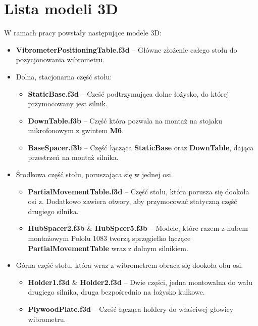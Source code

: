 \chapter{Lista modeli 3D}
W ramach pracy powstały następujące modele 3D:
\begin{itemize}
    \item \textbf{VibrometerPositioningTable.f3d} -- Główne złożenie całego stołu do pozycjonowania wibrometru.
    \item Dolna, stacjonarna część stołu:
    \begin{itemize}
        \item \textbf{StaticBase.f3d} -- Cześć podtrzymująca dolne łożysko, do której przymocowany jest silnik.
        \item  \textbf{DownTable.f3b} -- Część która pozwala na montaż na stojaku mikrofonowym z gwintem \textbf{M6}.
        \item  \textbf{BaseSpacer.f3b} -- Część łącząca \textbf{StaticBase} oraz \textbf{DownTable}, dająca przestrzeń na montaż silnika.
    \end{itemize}
    \item Środkowa część stołu, poruszająca się w jednej osi.
    \begin{itemize}
        \item \textbf{PartialMovementTable.f3d} -- Część stołu, która porusza się dookoła osi z. Dodatkowo zawiera otwory, aby przymocować statyczną część drugiego silnika.
        \item \textbf{HubSpacer2.f3b} \& \textbf{HubSpcer5.f3b} -- Modele, które razem z hubem montażowym Pololu 1083 tworzą sprzęgiełko łączące \textbf{PartialMovementTable} wraz z dolnym silnikiem.
    \end{itemize}
    \item Górna część stołu, która wraz z wibrometrem obraca się dookoła obu osi.
    \begin{itemize}
        \item \textbf{Holder1.f3d} \& \textbf{Holder2.f3d} -- Dwie części, jedna montowalna do wału drugiego silnika, druga bezpośrednio na łożysko kulkowe.
        \item \textbf{PlywoodPlate.f3d} -- Cześć łącząca holdery do właściwej głowicy wibrometru.
    \end{itemize}
    
\end{itemize}